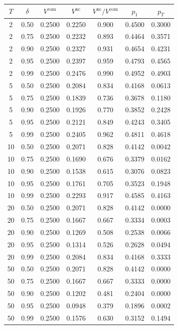 \begin{tabular}{ccccccc}
\toprule
$T$ & $\delta$ & $V^{\mathrm{com}}$ & $V^{\mathrm{nc}}$ & $V^{\mathrm{nc}}/V^{\mathrm{com}}$ & $p_1$ & $p_T$ \\
\midrule
2 & 0.50 & 0.2500 & 0.2250 & 0.900 & 0.4500 & 0.3000 \\
2 & 0.75 & 0.2500 & 0.2232 & 0.893 & 0.4464 & 0.3571 \\
2 & 0.90 & 0.2500 & 0.2327 & 0.931 & 0.4654 & 0.4231 \\
2 & 0.95 & 0.2500 & 0.2397 & 0.959 & 0.4793 & 0.4565 \\
2 & 0.99 & 0.2500 & 0.2476 & 0.990 & 0.4952 & 0.4903 \\
\midrule
5 & 0.50 & 0.2500 & 0.2084 & 0.834 & 0.4168 & 0.0613 \\
5 & 0.75 & 0.2500 & 0.1839 & 0.736 & 0.3678 & 0.1180 \\
5 & 0.90 & 0.2500 & 0.1926 & 0.770 & 0.3852 & 0.2428 \\
5 & 0.95 & 0.2500 & 0.2121 & 0.849 & 0.4243 & 0.3405 \\
5 & 0.99 & 0.2500 & 0.2405 & 0.962 & 0.4811 & 0.4618 \\
\midrule
10 & 0.50 & 0.2500 & 0.2071 & 0.828 & 0.4142 & 0.0042 \\
10 & 0.75 & 0.2500 & 0.1690 & 0.676 & 0.3379 & 0.0162 \\
10 & 0.90 & 0.2500 & 0.1538 & 0.615 & 0.3076 & 0.0823 \\
10 & 0.95 & 0.2500 & 0.1761 & 0.705 & 0.3523 & 0.1948 \\
10 & 0.99 & 0.2500 & 0.2293 & 0.917 & 0.4585 & 0.4163 \\
\midrule
20 & 0.50 & 0.2500 & 0.2071 & 0.828 & 0.4142 & 0.0000 \\
20 & 0.75 & 0.2500 & 0.1667 & 0.667 & 0.3334 & 0.0003 \\
20 & 0.90 & 0.2500 & 0.1269 & 0.508 & 0.2538 & 0.0066 \\
20 & 0.95 & 0.2500 & 0.1314 & 0.526 & 0.2628 & 0.0494 \\
20 & 0.99 & 0.2500 & 0.2084 & 0.834 & 0.4168 & 0.3333 \\
\midrule
50 & 0.50 & 0.2500 & 0.2071 & 0.828 & 0.4142 & 0.0000 \\
50 & 0.75 & 0.2500 & 0.1667 & 0.667 & 0.3333 & 0.0000 \\
50 & 0.90 & 0.2500 & 0.1202 & 0.481 & 0.2404 & 0.0000 \\
50 & 0.95 & 0.2500 & 0.0948 & 0.379 & 0.1896 & 0.0002 \\
50 & 0.99 & 0.2500 & 0.1576 & 0.630 & 0.3152 & 0.1494 \\

\end{tabular}
